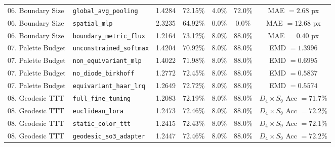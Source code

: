 \begin{table}[t]
\begin{tabular}{llccccc}
06. Boundary Size & \texttt{global\_avg\_pooling} & 1.4284 & 72.15\% & 4.0\% & 72.0\% & MAE $=2.68$ px \\
06. Boundary Size & \texttt{spatial\_mlp} & 2.3235 & 64.92\% & 0.0\% & 0.0\% & MAE $=12.68$ px \\
06. Boundary Size & \texttt{boundary\_metric\_flux} & 1.2164 & 73.12\% & 8.0\% & 88.0\% & MAE $=0.40$ px \\
\midrule
07. Palette Budget & \texttt{unconstrained\_softmax} & 1.4204 & 70.92\% & 8.0\% & 88.0\% & EMD $=1.3996$ \\
07. Palette Budget & \texttt{non\_equivariant\_mlp} & 1.4022 & 71.98\% & 8.0\% & 88.0\% & EMD $=0.6995$ \\
07. Palette Budget & \texttt{no\_diode\_birkhoff} & 1.2772 & 72.45\% & 8.0\% & 88.0\% & EMD $=0.5837$ \\
07. Palette Budget & \texttt{equivariant\_haar\_lrq} & 1.2649 & 72.72\% & 8.0\% & 88.0\% & EMD $=0.5574$ \\
\midrule
08. Geodesic TTT & \texttt{full\_fine\_tuning} & 1.2083 & 72.19\% & 8.0\% & 88.0\% & $D_4\times S_9$ Acc $=71.7\%$ \\
08. Geodesic TTT & \texttt{euclidean\_lora} & 1.2473 & 72.46\% & 8.0\% & 88.0\% & $D_4\times S_9$ Acc $=72.2\%$ \\
08. Geodesic TTT & \texttt{static\_color\_ttt} & 1.2415 & 72.43\% & 8.0\% & 88.0\% & $D_4\times S_9$ Acc $=72.1\%$ \\
08. Geodesic TTT & \texttt{geodesic\_so3\_adapter} & 1.2447 & 72.46\% & 8.0\% & 88.0\% & $D_4\times S_9$ Acc $=72.2\%$ \\
\bottomrule
\end{tabular}
\end{table}
